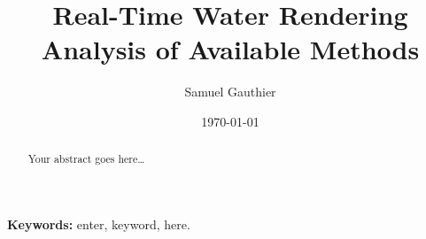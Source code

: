 \title{\textbf{Real-Time Water Rendering}\\\Large{Analysis of Available
Methods}}

\author{\normalsize{Samuel Gauthier}}
\date{\normalsize{\today}}
\maketitle

\begin{abstract}
Your abstract goes here\ldots\\
\end{abstract}

\small{{\bf Keywords:} enter, keyword, here.}
